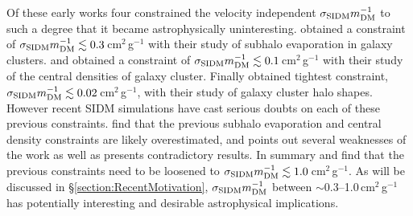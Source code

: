 Of these early works four constrained the velocity independent $\sigma_{\rm SIDM}m_{\rm DM}^{-1}$ to such a degree that it became astrophysically uninteresting.
\citet{Gnedin:2001gd} obtained a constraint of $\sigma_{\rm SIDM}m_{\rm DM}^{-1}\lesssim 0.3$\,cm$^2$\,g$^{-1}$ with their study of subhalo evaporation in galaxy clusters.
\citet{Yoshida:2000gn} and \citet{Meneghetti:2001en} obtained a constraint of $\sigma_{\rm SIDM}m_{\rm DM}^{-1}\lesssim 0.1$\,cm$^2$\,g$^{-1}$ with their study of the central densities of galaxy cluster.
Finally \citet{MiraldaEscude:2002ev} obtained tightest constraint, $\sigma_{\rm SIDM}m_{\rm DM}^{-1}\lesssim 0.02$\,cm$^2$\,g$^{-1}$, with their study of galaxy cluster halo shapes.
However recent SIDM simulations \citep{Peter:2012vi, Rocha:2012tr} have cast serious doubts on each of these previous constraints.
\citet{Rocha:2012tr} find that the previous subhalo evaporation and central density constraints are likely overestimated, and \citet{Peter:2012vi} points out several weaknesses of the \citet{MiraldaEscude:2002ev} work as well as presents contradictory results.
In summary \citet{Peter:2012vi} and \citet{Rocha:2012tr} find that the previous constraints need to be loosened to $\sigma_{\rm SIDM}m_{\rm DM}^{-1}\lesssim 1.0$\,cm$^2$\,g$^{-1}$.
As will be discussed in \S\ref{section:RecentMotivation},  $\sigma_{\rm SIDM}m_{\rm DM}^{-1}$ between $\sim$0.3--1.0\,cm$^2$\,g$^{-1}$ has potentially interesting and desirable astrophysical implications.

